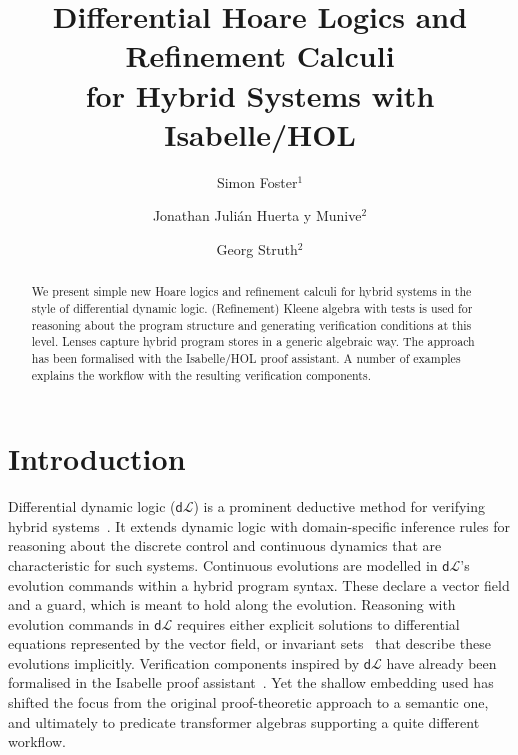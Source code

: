 \documentclass[envcountsame]{llncs}
\newcommand{\dL}{\mathsf{d}\mathcal{L}}
\begin{document}
\title{Differential Hoare Logics and Refinement Calculi\\ for Hybrid Systems with Isabelle/HOL}

\author{Simon Foster$^1$ \and Jonathan Juli\'an Huerta y Munive$^2$ \and Georg Struth$^2$} 


\maketitle

\begin{abstract} 
  We present simple new Hoare logics and refinement calculi for hybrid
  systems in the style of differential dynamic logic. (Refinement)
  Kleene algebra with tests is used for reasoning about the program
  structure and generating verification conditions at this level.
  Lenses capture hybrid program stores in a generic algebraic way. The
  approach has been formalised with the Isabelle/HOL proof
  assistant. A number of examples explains the workflow with the
  resulting verification components.
\end{abstract}



\section{Introduction}\label{sec:introduction}

Differential dynamic logic ($\dL$) is a prominent deductive method for
verifying hybrid systems~\cite{Platzer18}. It extends dynamic logic
with domain-specific inference rules for reasoning about the discrete
control and continuous dynamics that are characteristic for such
systems. Continuous evolutions are modelled in $\dL$'s evolution
commands within a hybrid program syntax. These declare a vector field
and a guard, which is meant to hold along the evolution.  Reasoning
with evolution commands in $\dL$ requires either explicit solutions to
differential equations represented by the vector field, or invariant
sets~\cite{Teschl12} that describe these evolutions implicitly. Verification
components inspired by $\dL$ have already been formalised in the
Isabelle proof assistant~\cite{MuniveS19}. Yet the shallow embedding
used has shifted the focus from the original proof-theoretic approach
to a semantic one, and ultimately to predicate transformer algebras
supporting a quite different workflow.
\end{document}
